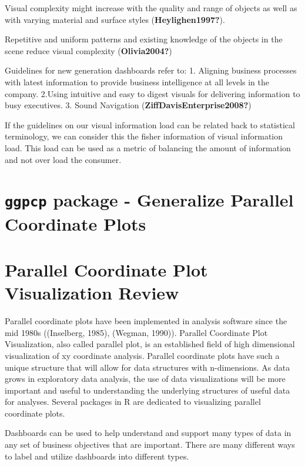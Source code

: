 \documentclass[print]{nuthesis}
\begin{document}
Visual complexity might increase with the quality and range of objects as well as with varying material and surface styles (\textbf{Heylighen1997?}).

Repetitive and uniform patterns and existing knowledge of the objects in the scene reduce visual complexity (\textbf{Olivia2004?})

Guidelines for new generation dashboards refer to:
1. Aligning business processes with latest information to provide business intelligence at all levels in the company.
2.Using intuitive and easy to digest visuals for delivering information to busy executives.
3. Sound Navigation
(\textbf{ZiffDavisEnterprise2008?})

If the guidelines on our visual information load can be related back to statistical terminology, we can consider this the fisher information of visual information load. This load can be used as a metric of balancing the amount of information and not over load the consumer.

\hypertarget{ggpcp-package---generalize-parallel-coordinate-plots}{%
\section{\texorpdfstring{\texttt{ggpcp} package - Generalize Parallel Coordinate Plots}{ggpcp package - Generalize Parallel Coordinate Plots}}\label{ggpcp-package---generalize-parallel-coordinate-plots}}

\hypertarget{parallel-coordinate-plot-visualization-review}{%
\section{Parallel Coordinate Plot Visualization Review}\label{parallel-coordinate-plot-visualization-review}}

Parallel coordinate plots have been implemented in analysis software since the mid 1980s ((Inselberg, 1985), (Wegman, 1990)). Parallel Coordinate Plot Visualization, also called parallel plot, is an established field of high dimensional visualization of xy coordinate analysis. Parallel coordinate plots have such a unique structure that will allow for data structures with n-dimensions. As data grows in exploratory data analysis, the use of data visualizations will be more important and useful to understanding the underlying structures of useful data for analyses. Several packages in R are dedicated to visualizing parallel coordinate plots.

Dashboards can be used to help understand and support many types of data in any set of business objectives that are important. There are many different ways to label and utilize dashboards into different types.
\end{document}
